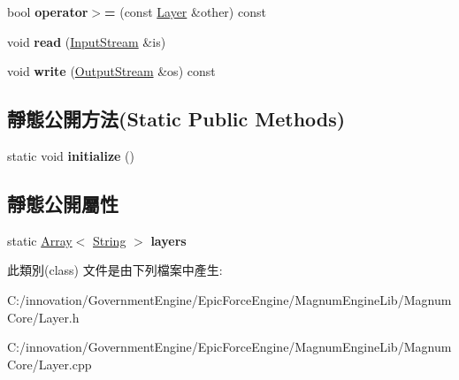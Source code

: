 \begin{DoxyCompactItemize}
\item 
bool {\bfseries operator$>$=} (const \hyperlink{class_i_dream_sky_1_1_layer}{Layer} \&other) const \hypertarget{class_i_dream_sky_1_1_layer_a0bd629665d6e657d52702fe2c45e73d1}{}\label{class_i_dream_sky_1_1_layer_a0bd629665d6e657d52702fe2c45e73d1}

\item 
void {\bfseries read} (\hyperlink{class_i_dream_sky_1_1_input_stream}{Input\+Stream} \&is)\hypertarget{class_i_dream_sky_1_1_layer_a81ed371d4688ac553d0569779e3f2601}{}\label{class_i_dream_sky_1_1_layer_a81ed371d4688ac553d0569779e3f2601}

\item 
void {\bfseries write} (\hyperlink{class_i_dream_sky_1_1_output_stream}{Output\+Stream} \&os) const \hypertarget{class_i_dream_sky_1_1_layer_aaabff3625bc9ead0ac209bb31ccff3fd}{}\label{class_i_dream_sky_1_1_layer_aaabff3625bc9ead0ac209bb31ccff3fd}

\end{DoxyCompactItemize}
\subsection*{靜態公開方法(Static Public Methods)}
\begin{DoxyCompactItemize}
\item 
static void {\bfseries initialize} ()\hypertarget{class_i_dream_sky_1_1_layer_a73e3b04ba32db857c1bf935b3153db44}{}\label{class_i_dream_sky_1_1_layer_a73e3b04ba32db857c1bf935b3153db44}

\end{DoxyCompactItemize}
\subsection*{靜態公開屬性}
\begin{DoxyCompactItemize}
\item 
static \hyperlink{class_i_dream_sky_1_1_array}{Array}$<$ \hyperlink{class_i_dream_sky_1_1_string}{String} $>$ {\bfseries layers}\hypertarget{class_i_dream_sky_1_1_layer_a05d82a002876614356efa0d93f68d65c}{}\label{class_i_dream_sky_1_1_layer_a05d82a002876614356efa0d93f68d65c}

\end{DoxyCompactItemize}


此類別(class) 文件是由下列檔案中產生\+:\begin{DoxyCompactItemize}
\item 
C\+:/innovation/\+Government\+Engine/\+Epic\+Force\+Engine/\+Magnum\+Engine\+Lib/\+Magnum\+Core/Layer.\+h\item 
C\+:/innovation/\+Government\+Engine/\+Epic\+Force\+Engine/\+Magnum\+Engine\+Lib/\+Magnum\+Core/Layer.\+cpp\end{DoxyCompactItemize}
